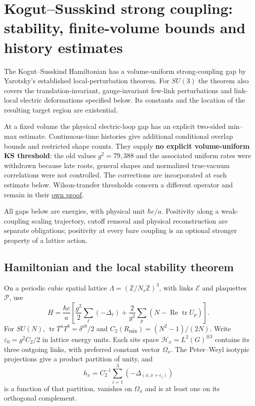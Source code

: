 \documentclass[11pt,a4paper]{article}
\begin{document}
\hypertarget{kogutsusskind-strong-coupling-stability-finite-volume-bounds-and-history-estimates}{%
\section{Kogut--Susskind strong coupling: stability, finite-volume
bounds and history
estimates}\label{kogutsusskind-strong-coupling-stability-finite-volume-bounds-and-history-estimates}}

The Kogut--Susskind Hamiltonian has a volume-uniform strong-coupling gap
by Yarotsky's established local-perturbation theorem. For \(SU(3)\) the
theorem also covers the translation-invariant, gauge-invariant few-link
perturbations and link-local electric deformations specified below. Its
constants and the location of the resulting target region are
existential.

At a fixed volume the physical electric-loop gap has an explicit
two-sided min--max estimate. Continuous-time histories give additional
conditional overlap bounds and restricted shape counts. They supply
\textbf{no explicit volume-uniform KS threshold}: the old values
\(g^2=79,388\) and the associated uniform rates were withdrawn because
late roots, general shapes and normalized true-vacuum correlations were
not controlled. The corrections are incorporated at each estimate below.
Wilson-transfer thresholds concern a different operator and remain in
their \href{wilson-strong-coupling-explicit.md}{own proof}.

All gaps below are energies, with physical unit \(\hbar c/a\).
Positivity along a weak-coupling scaling trajectory, cutoff removal and
physical reconstruction are separate obligations; positivity at every
bare coupling is an optional stronger property of a lattice action.

\hypertarget{hamiltonian-and-the-local-stability-theorem}{%
\subsection{Hamiltonian and the local stability
theorem}\label{hamiltonian-and-the-local-stability-theorem}}

On a periodic cubic spatial lattice
\(\Lambda=(\mathbb Z/N_s\mathbb Z)^3\), with links \(\mathcal E\) and
plaquettes \(\mathcal P\), use
\[H=\frac{\hbar c}{a}\left[\frac{g^2}{2}\sum_\ell(-\Delta_\ell)
 +\frac2{g^2}\sum_p(N-\operatorname{Re}\operatorname{tr}U_p)\right].\]
For \(SU(N)\), \(\operatorname{tr}T^aT^b=\delta^{ab}/2\) and
\(C_2(R_{\min})=(N^2-1)/(2N)\). Write \(\varepsilon_0=g^2C_2/2\) in
lattice energy units. Each site space \(\mathcal H_x=L^2(G)^{\otimes3}\)
contains its three outgoing links, with preferred constant vector
\(\Omega_x\). The Peter--Weyl isotypic projections give a product
partition of unity, and
\[h_x=C_2^{-1}\sum_{i=1}^3(-\Delta_{(x,x+e_i)})\] is a function of that
partition, vanishes on \(\Omega_x\) and is at least one on its
orthogonal complement.
\end{document}
